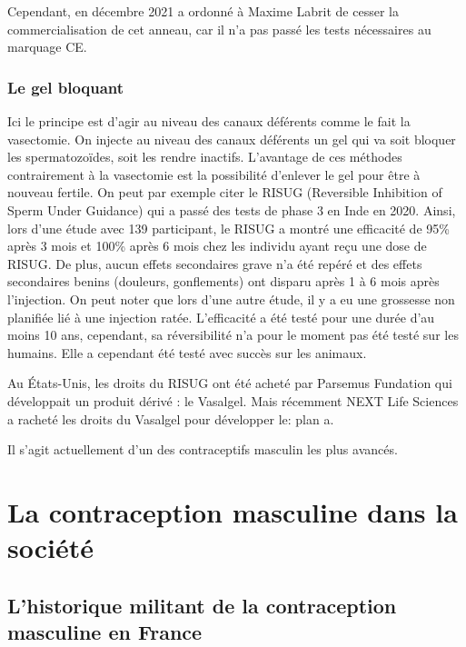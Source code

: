 \documentclass[12pt,a4paper]{report}
\begin{document}
Cependant, en décembre 2021 a ordonné à Maxime Labrit de cesser la commercialisation de cet anneau, car il n'a pas passé les tests nécessaires au marquage CE. \cite{ActualiteAnneauContraceptif}

\subsection{Le gel bloquant}

Ici le principe est d'agir au niveau des canaux déférents comme le fait la vasectomie. On injecte au niveau des canaux déférents un gel qui va soit bloquer les spermatozoïdes, soit les rendre inactifs.
L'avantage de ces méthodes contrairement à la vasectomie est la possibilité d'enlever le gel pour être à nouveau fertile.
On peut par exemple citer le RISUG (Reversible Inhibition of Sperm Under Guidance) qui a passé des tests de phase 3 en Inde en 2020. \cite{ContraceptionMasculineScience}
Ainsi, lors d'une étude avec 139 participant, le RISUG a montré une efficacité de 95\% après 3 mois et 100\% après 6 mois chez les individu ayant reçu une dose de RISUG. De plus, aucun effets secondaires grave n'a été repéré et des effets secondaires benins (douleurs, gonflements) ont disparu après 1 à 6 mois après l'injection. \cite{sharmaSafetyEfficacyIntravasal2019}
On peut noter que lors d'une autre étude, il y a eu une grossesse non planifiée lié à une injection ratée. \cite{RisugWikipedia}
L'efficacité a été testé pour une durée d'au moins 10 ans, cependant, sa réversibilité n'a pour le moment pas été testé sur les humains. Elle a cependant été testé avec succès sur les animaux. \cite{khilwaniRISUGMaleContraceptive2020}

Au États-Unis, les droits du RISUG ont été acheté par Parsemus Fundation qui développait un produit dérivé : le Vasalgel. Mais récemment NEXT Life Sciences a racheté les droits du Vasalgel pour développer le: plan a. \cites{ReversibleInhibitionSperm}{VasalgelMaleContraceptive}{PlanReversibleMale}

Il s'agit actuellement d'un des contraceptifs masculin les plus avancés. \cite{ContraceptionMasculineScience}

\chapter{La contraception masculine dans la société}

\section{L'historique militant de la contraception masculine en France}
\end{document}
